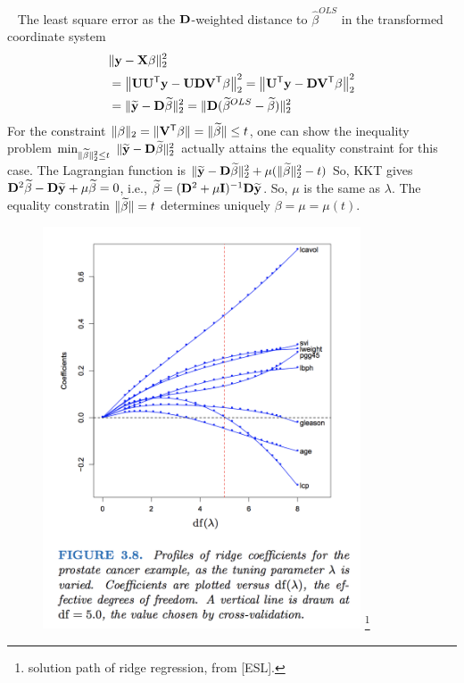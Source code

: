 \documentclass[english,handout]{beamer}
\newcommand{\U}{{\bf U}}
\newcommand{\D}{{\bf D}}
\newcommand{\V}{{\bf V}}
\newcommand{\y}{{\bf y}}
\newcommand{\bh}{{ \hat{\beta} }}
\theoremstyle{definition}
\begin{document}
 


 \frame
 {~
 {\footnotesize 
  The least square error as the 
  $\D$-weighted distance to $\bh^{OLS}$
in the transformed coordinate system
 \begin{align*}
 &\|{\bf y}- {\bf X} \beta\|_2^2 
 \\
 &= \norm{\U\U^\tr \y -\U\D\V^\tr \beta}_2^2
 =\norm{\U^\tr \y -\D\V^\tr \beta}_2^2
 \\
&=\| \wt{\y}- \D \wt{\beta}\|_2^2
  =\| \D ( \wt{\beta}^{OLS}-  \wt{\beta})\|_2^2
  \end{align*}
  For  the constraint $\|\beta\|_2=\|\V^\tr \beta\|=\|\wt{\beta}\|\leq t$,
  one can show the inequality problem 
$\min_{\|\wt{\beta}\|_2^2 \leq t} ~\| \wt{\y}- \D \wt{\beta}\|_2^2
    $ 
    actually attains   the equality constraint for this case.
    The Lagrangian function is 
    $\| \wt{\y}- \D \wt{\beta}\|_2^2 + \mu ( \|\wt{\beta}\|_2^2  -t)  $
    So, KKT gives $\D^2 \wt{\beta} -   \D  \wt{\y} + \mu \wt{\beta}=0 $, i.e., 
    $\wt{\beta}= (\D^2+\mu\eye)^{-1} \D\wt{\y}$. So, 
    $\mu$ is the same as $\lambda$.
    The equality constratin  $\|{\widetilde{\beta}}\|=t$ determines
    uniquely $\beta=\mu=\mu(t)$. 
  }  
}
 



\begin{frame} 
  \begin{figure}
    \includegraphics[width=0.84\textwidth, height=0.7\textwidth]{fig_ridge_path.png}
\footnote{%
solution path  of ridge regression, from [ESL]. }
  \end{figure}

\end{frame}
\end{document}
